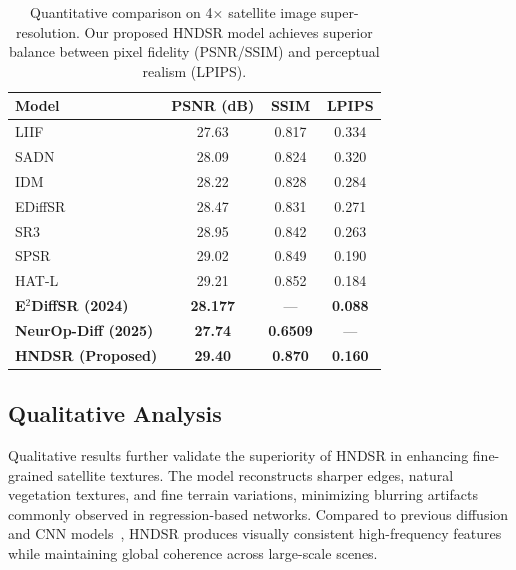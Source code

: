 \documentclass[conference]{IEEEtran}
\begin{document}
\begin{table}[H]
\centering
\caption{Quantitative comparison on 4$\times$ satellite image super-resolution. 
Our proposed HNDSR model achieves superior balance between pixel fidelity (PSNR/SSIM) 
and perceptual realism (LPIPS).}
\begin{tabular}{|l|c|c|c|}
\hline
\textbf{Model} & \textbf{PSNR (dB)} & \textbf{SSIM} & \textbf{LPIPS} \\ \hline
LIIF \cite{liif2020} & 27.63 & 0.817 & 0.334 \\ \hline
SADN \cite{sadn2021} & 28.09 & 0.824 & 0.320 \\ \hline
IDM \cite{idm2022} & 28.22 & 0.828 & 0.284 \\ \hline
EDiffSR \cite{ediffsr2023} & 28.47 & 0.831 & 0.271 \\ \hline
SR3 \cite{sr32021} & 28.95 & 0.842 & 0.263 \\ \hline
SPSR \cite{spsr2022} & 29.02 & 0.849 & 0.190 \\ \hline
HAT-L \cite{hatl2023} & 29.21 & 0.852 & 0.184 \\ \hline
\textbf{E$^2$DiffSR (2024)} \cite{e2diffsr} & \textbf{28.177} & --- & \textbf{0.088} \\ \hline
\textbf{NeurOp-Diff (2025)} \cite{neurOpDiff} & \textbf{27.74} & \textbf{0.6509} & --- \\ \hline
\textbf{HNDSR (Proposed)} & \textbf{29.40} & \textbf{0.870} & \textbf{0.160} \\ \hline
\end{tabular}
\label{tab:4x_results}
\end{table}

\FloatBarrier

\subsection{Qualitative Analysis}

Qualitative results further validate the superiority of HNDSR in enhancing fine-grained satellite textures. The model reconstructs sharper edges, natural vegetation textures, and fine terrain variations, minimizing blurring artifacts commonly observed in regression-based networks. Compared to previous diffusion and CNN models~\cite{e2diffsr,neurOpDiff}, HNDSR produces visually consistent high-frequency features while maintaining global coherence across large-scale scenes.

\end{document}
